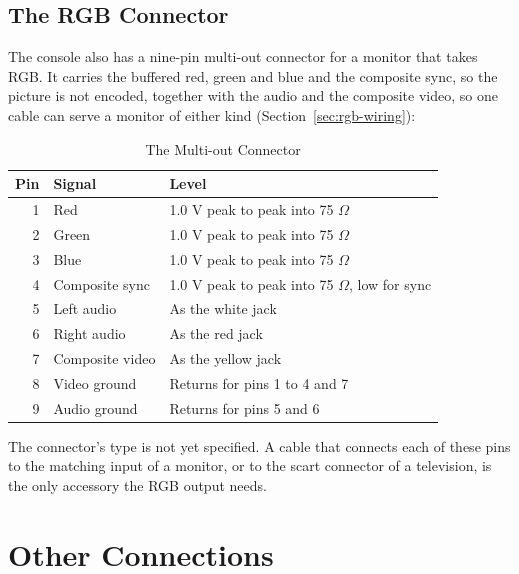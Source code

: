 \subsection{The RGB Connector}

The console also has a nine-pin multi-out connector for a monitor that takes RGB. It carries the buffered red, green
and blue and the composite sync, so the picture is not encoded, together with the audio and the composite video, so one
cable can serve a monitor of either kind (Section~\ref{sec:rgb-wiring}):

\begin{table}[H]
	\centering
	\begin{tabular}{rll}
		\toprule
		\textbf{Pin} & \textbf{Signal} & \textbf{Level}                                    \\
		\midrule
		1            & Red             & 1.0 V peak to peak into 75 $\Omega$               \\
		2            & Green           & 1.0 V peak to peak into 75 $\Omega$               \\
		3            & Blue            & 1.0 V peak to peak into 75 $\Omega$               \\
		4            & Composite sync  & 1.0 V peak to peak into 75 $\Omega$, low for sync \\
		5            & Left audio      & As the white jack                                 \\
		6            & Right audio     & As the red jack                                   \\
		7            & Composite video & As the yellow jack                                \\
		8            & Video ground    & Returns for pins 1 to 4 and 7                     \\
		9            & Audio ground    & Returns for pins 5 and 6                          \\
		\bottomrule
	\end{tabular}
	\caption{The Multi-out Connector}
	\label{tab:multi-out}
\end{table}

\noindent The connector's type is not yet specified. A cable that connects each of these pins to the matching input of a
monitor, or to the scart connector of a television, is the only accessory the RGB output needs.

\section{Other Connections}


